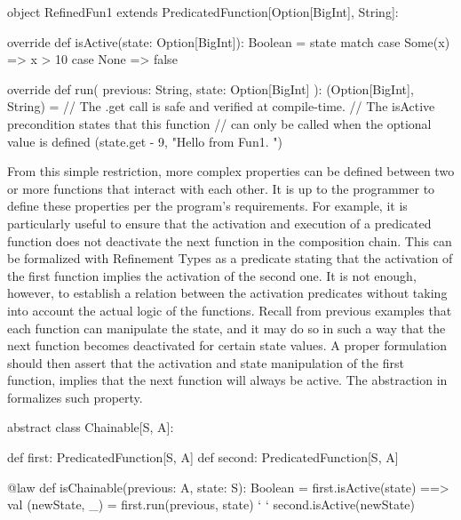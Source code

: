 \begin{scala}[label=lst:predicated-function-run-precondition-example, caption=Refinement Typed-Checked example of the run function]
object RefinedFun1 extends PredicatedFunction[Option[BigInt], String]:

  override def isActive(state: Option[BigInt]): Boolean =
    state match
      case Some(x) => x > 10
      case None    => false

  override def run(
      previous: String,
      state: Option[BigInt]
  ): (Option[BigInt], String) =
    // The .get call is safe and verified at compile-time.
    // The isActive precondition states that this function
    // can only be called when the optional value is defined
    (state.get - 9, "Hello from Fun1. ")
\end{scala}

From this simple restriction, more complex properties can be defined between two or more functions 
that interact with each other. It is up to the programmer to define these properties per the program's 
requirements. For example, it is particularly useful to ensure that the activation and execution of a 
predicated function does not deactivate the next function in the composition chain. This can be 
formalized with Refinement Types as a predicate stating that the activation of the first function implies 
the activation of the second one. It is not enough, however, to establish a relation between the 
activation predicates without taking into account the actual logic of the functions. Recall from previous 
examples that each function can manipulate the state, and it may do so in such a way that the next 
function becomes deactivated for certain state values.
A proper formulation should then assert that the activation and state manipulation of the first function, 
implies that the next function will always be active. The  abstraction in 
 formalizes such property.

\begin{scala}[label=lst:predicated-function-chainable, caption=Chainable type for expressing and verifying dependencies between predicated functions]
abstract class Chainable[S, A]:

  def first: PredicatedFunction[S, A]
  def second: PredicatedFunction[S, A]

  @law
  def isChainable(previous: A, state: S): Boolean =
    first.isActive(state) ==> {
      val (newState, _) = first.run(previous, state) ` \label{ln:predicated-function-chainable.first.run} `
      second.isActive(newState)
    }
\end{scala}

